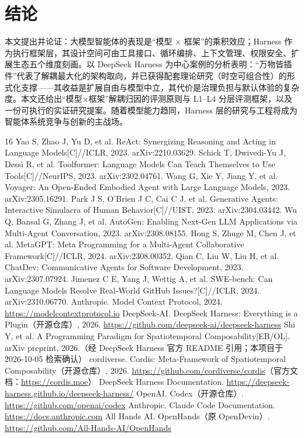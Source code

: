 \documentclass[11pt,a4paper]{ctexart}
\begin{document}
\section{结论}

本文提出并论证：大模型智能体的表现是“模型 × 框架”的乘积效应；Harness 作为执行框架层，其设计空间可由工具接口、循环编排、上下文管理、权限安全、扩展生态五个维度刻画。以 DeepSeek Harness 为中心案例的分析表明：“万物皆插件”代表了解耦最大化的架构取向，并已获得配套理论研究（时空可组合性）的形式化支撑——其收益是扩展自由与模型中立，其代价是治理负担与默认体验的复杂度。本文还给出“模型×框架”解耦归因的评测原则与 L1--L4 分层评测框架，以及一份可执行的实证研究提案。随着模型能力趋同，Harness 层的研究与工程将成为智能体系统竞争与创新的主战场。

\begin{thebibliography}{16}
 Yao S, Zhao J, Yu D, et al. ReAct: Synergizing Reasoning and Acting in Language Models[C]//ICLR, 2023. arXiv:2210.03629.
 Schick T, Dwivedi-Yu J, Dessì R, et al. Toolformer: Language Models Can Teach Themselves to Use Tools[C]//NeurIPS, 2023. arXiv:2302.04761.
 Wang G, Xie Y, Jiang Y, et al. Voyager: An Open-Ended Embodied Agent with Large Language Models, 2023. arXiv:2305.16291.
 Park J S, O'Brien J C, Cai C J, et al. Generative Agents: Interactive Simulacra of Human Behavior[C]//UIST, 2023. arXiv:2304.03442.
 Wu Q, Bansal G, Zhang J, et al. AutoGen: Enabling Next-Gen LLM Applications via Multi-Agent Conversation, 2023. arXiv:2308.08155.
 Hong S, Zhuge M, Chen J, et al. MetaGPT: Meta Programming for a Multi-Agent Collaborative Framework[C]//ICLR, 2024. arXiv:2308.00352.
 Qian C, Liu W, Liu H, et al. ChatDev: Communicative Agents for Software Development, 2023. arXiv:2307.07924.
 Jimenez C E, Yang J, Wettig A, et al. SWE-bench: Can Language Models Resolve Real-World GitHub Issues?[C]//ICLR, 2024. arXiv:2310.06770.
 Anthropic. Model Context Protocol, 2024. \url{https://modelcontextprotocol.io}
 DeepSeek-AI. DeepSeek Harness: Everything is a Plugin（开源仓库）, 2026. \url{https://github.com/deepseek-ai/deepseek-harness}
 Shi Y, et al. A Programming Paradigm for Spatiotemporal Composability[EB/OL]. arXiv preprint, 2026.（经 DeepSeek Harness 官方 README 引用；本项目于 2026-10-05 检索确认）
 cordiverse. Cordis: Meta-Framework of Spatiotemporal Composability（开源仓库）, 2026. \url{https://github.com/cordiverse/cordis}（官方文档：\url{https://cordis.moe}）
 DeepSeek Harness Documentation. \url{https://deepseek-harness.github.io/deepseek-harness/}
 OpenAI. Codex（开源仓库）. \url{https://github.com/openai/codex}
 Anthropic. Claude Code Documentation. \url{https://docs.anthropic.com}
 All Hands AI. OpenHands（原 OpenDevin）. \url{https://github.com/All-Hands-AI/OpenHands}
\end{thebibliography}
\end{document}
